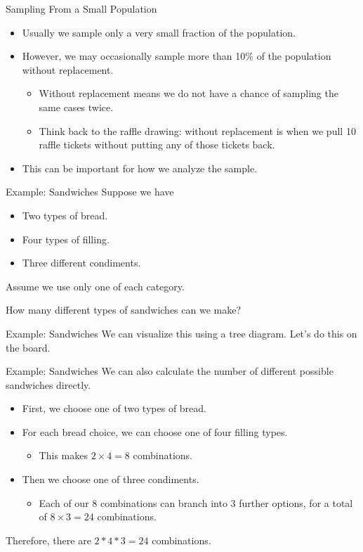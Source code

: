 \begin{frame}{Sampling From a Small Population}
    \begin{itemize}
        \item Usually we sample only a very small fraction of the population.
        \item However, we may occasionally sample more than 10\% of the population without replacement.
        \begin{itemize}
            \item Without replacement means we do not have a chance of sampling the same cases twice.
            \item Think back to the raffle drawing: without replacement is when we pull 10 raffle tickets without putting any of those tickets back.
        \end{itemize}
        \item This can be important for how we analyze the sample.
    \end{itemize}
\end{frame}

\begin{frame}{Example: Sandwiches}
    Suppose we have
    \begin{itemize}
        \item Two types of bread.
        \item Four types of filling.
        \item Three different condiments.
    \end{itemize}
    Assume we use only one of each category.
    
    \vspace{12pt}How many different types of sandwiches can we make?
\end{frame}

\begin{frame}{Example: Sandwiches}
    We can visualize this using a tree diagram. Let's do this on the board.
\end{frame}

\begin{frame}{Example: Sandwiches}
    We can also calculate the number of different possible sandwiches directly.
    \begin{itemize}
        \item First, we choose one of two types of bread. 
        \item For each bread choice, we can choose one of four filling types. 
        \begin{itemize}
            \item This makes $2\times 4=8$ combinations.
        \end{itemize}
        \item Then we choose one of three condiments.
        \begin{itemize}
            \item Each of our 8 combinations can branch into 3 further options, for a total of $8\times3=24$ combinations.
        \end{itemize}
    \end{itemize}
    Therefore, there are $2*4*3=24$ combinations.
\end{frame}

